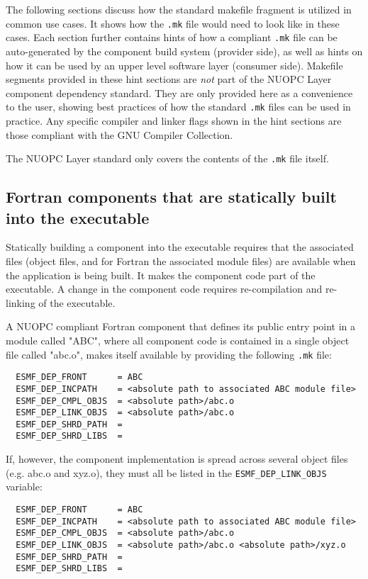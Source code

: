 The following sections discuss how the standard makefile fragment is utilized in common use cases. It shows how the {\tt .mk} file would need to look like in these cases. Each section further contains hints of how a compliant {\tt .mk} file can be auto-generated by the component build system (provider side), as well as hints on how it can be used by an upper level software layer (consumer side). Makefile segments provided in these hint sections are {\em not} part of the NUOPC Layer component dependency standard. They are only provided here as a convenience to the user, showing best practices of how the standard {\tt .mk} files can be used in practice. Any specific compiler and linker flags shown in the hint sections are those compliant with the GNU Compiler Collection. 

The NUOPC Layer standard only covers the contents of the {\tt .mk} file itself.

\subsection{Fortran components that are statically built into the executable}
\label{StandardCompDep:FortranStatic}

Statically building a component into the executable requires that the associated files (object files, and for Fortran the associated module files) are available when the application is being built. It makes the component code part of the executable. A change in the component code requires re-compilation and re-linking of the executable.

A NUOPC compliant Fortran component that defines its public entry point in a module called "ABC", where all component code is contained in a single object file called "abc.o", makes itself available by providing the following {\tt .mk} file:

\begin{verbatim}
  ESMF_DEP_FRONT      = ABC
  ESMF_DEP_INCPATH    = <absolute path to associated ABC module file>
  ESMF_DEP_CMPL_OBJS  = <absolute path>/abc.o
  ESMF_DEP_LINK_OBJS  = <absolute path>/abc.o
  ESMF_DEP_SHRD_PATH  = 
  ESMF_DEP_SHRD_LIBS  =
\end{verbatim}

If, however, the component implementation is spread across several object files (e.g. abc.o and xyz.o), they must all be listed in the {\tt ESMF\_DEP\_LINK\_OBJS} variable:

\begin{verbatim}
  ESMF_DEP_FRONT      = ABC
  ESMF_DEP_INCPATH    = <absolute path to associated ABC module file>
  ESMF_DEP_CMPL_OBJS  = <absolute path>/abc.o
  ESMF_DEP_LINK_OBJS  = <absolute path>/abc.o <absolute path>/xyz.o
  ESMF_DEP_SHRD_PATH  = 
  ESMF_DEP_SHRD_LIBS  =
\end{verbatim}

